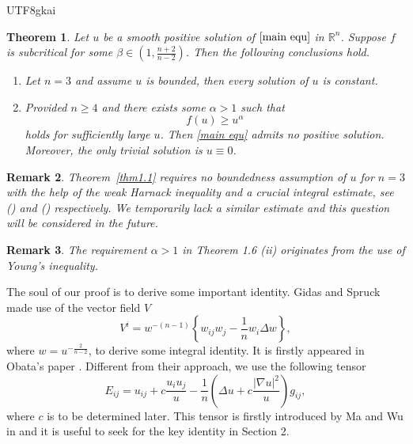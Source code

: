 \documentclass[reqno,12pt]{amsart}
\numberwithin{equation}{section}
\newtheorem{thm}{Theorem}[section]
\newtheorem{rmk}[thm]{Remark}
\newcommand{\thmref}[1]{Theorem~\ref{#1}}
\newcommand{\bR}{{\mathbb R}}  %
\begin{document}
\begin{CJK}{UTF8}{gkai}
		  	 \begin{thm}\label{mainthm3}
		  	 		Let $u$ be a smooth positive solution of $\eqref{main equ}$ in $\bR^{n}$. Suppose $f$ is subcritical for some $\beta\in (1,\frac{n+2}{n-2})$.   Then the following conclusions hold.
		  	 	\begin{enumerate}
		  	 		\item Let $n=3$ and assume $u$ is bounded, then every solution of $u$ is constant.
		  	 		\item Provided $n\ge 4$ and  there exists some $\alpha>1$ such that
		  	 		\begin{equation}\label{condition of mainthm3}
		  	 			f(u)\ge u^{\alpha}  
		  	 		\end{equation}
		  	 		holds for sufficiently large $u$. Then \eqref{main equ} admits no positive solution. Moreover, the only trivial solution is $u\equiv 0$.
		  	 	\end{enumerate}
		  	 \end{thm}
		  	 
		  	 \begin{rmk}
		  	 	\thmref{thm1.1} requires no boundedness assumption of $u$ for $n=3$ with the help of the weak Harnack inequality  and a crucial integral estimate, see \rm(\hspace{-0.03em}\cite[Lemma 3.2]{SZ}) and \rm(\hspace{-0.03em}\cite[Lemma 3.3]{SZ}) respectively. We temporarily lack a similar estimate and 
		  	  	this question will be considered in the future.
		  	 \end{rmk}
		  	 
		  	 \begin{rmk}
		  	    The requirement $\alpha>1$ in Theorem 1.6 {\rm(ii)} originates from the use of Young's inequality.
		  	    
		  	 \end{rmk}
		  	  The soul of our proof is  to derive some important identity.   Gidas and Spruck \cite{GS} made use of the vector field $V$ 
		  	  \begin{equation*}
		  	  	V^{i}=w^{-(n-1)}\left\{w_{ij}w_{j}-\frac{1}{n}w_{i}\Delta w\right\},
		  	  \end{equation*}
		  	  where $w=u^{-\frac{2}{n-2}}$, to  derive some integral identity. It is firstly appeared in  Obata's paper \cite{Obata}.   Different from their approach, we use the following tensor
		  	  \begin{equation*}
		  	  	E_{ij}=u_{ij}+c\frac{u_{i}u_{j}}{u}-\frac{1}{n}\left(\Delta u+c\frac{|\nabla u|^{2}}{u}\right)g_{ij},
		  	  \end{equation*}
		  	  where $c$ is to be determined later. This tensor is firstly introduced by Ma and Wu in \cite{MW} and it is useful to seek for the key identity in Section 2. 
		  	  

\end{CJK}
\end{document}
